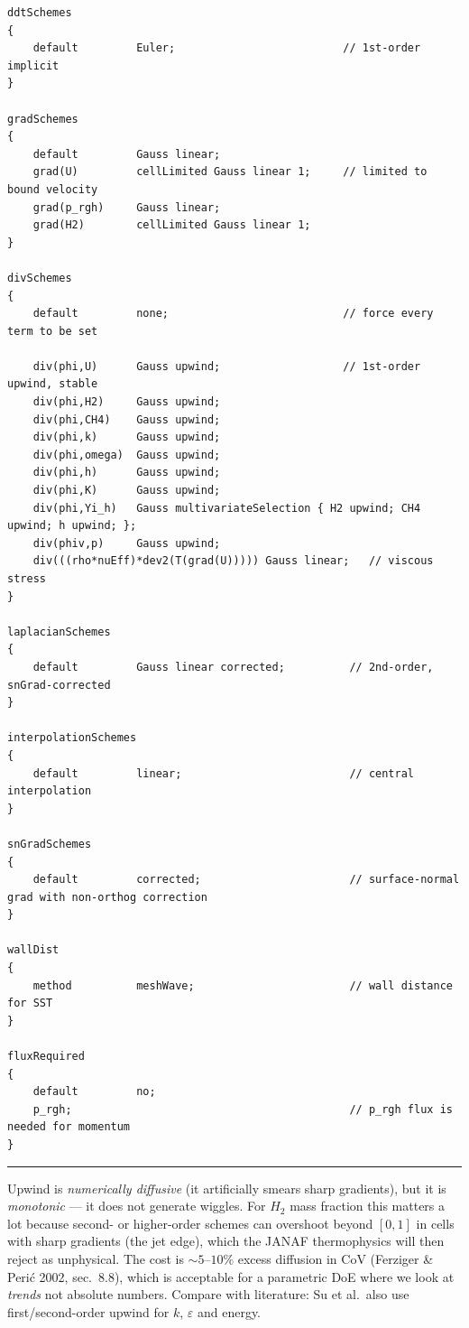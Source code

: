 \documentclass[11pt,a4paper]{article}
\newenvironment{whybox}[1][]{%
    \par\medskip\noindent
    \begin{list}{}{%
        \setlength{\leftmargin}{1.4em}%
        \setlength{\rightmargin}{0pt}%
        \setlength{\topsep}{0pt}%
    }\item[]%
    \textcolor{blue!50!black}{\rule[-0.4em]{2.5pt}{1.0em}}%
    \hspace{0.6em}{\sffamily\bfseries\color{blue!50!black}#1}\par\smallskip
}{%
    \end{list}\medskip
}
\begin{document}
\begin{lstlisting}[style=foamstyle,caption={\texttt{system/fvSchemes} (full)}]
ddtSchemes
{
    default         Euler;                          // 1st-order implicit
}

gradSchemes
{
    default         Gauss linear;
    grad(U)         cellLimited Gauss linear 1;     // limited to bound velocity
    grad(p_rgh)     Gauss linear;
    grad(H2)        cellLimited Gauss linear 1;
}

divSchemes
{
    default         none;                           // force every term to be set

    div(phi,U)      Gauss upwind;                   // 1st-order upwind, stable
    div(phi,H2)     Gauss upwind;
    div(phi,CH4)    Gauss upwind;
    div(phi,k)      Gauss upwind;
    div(phi,omega)  Gauss upwind;
    div(phi,h)      Gauss upwind;
    div(phi,K)      Gauss upwind;
    div(phi,Yi_h)   Gauss multivariateSelection { H2 upwind; CH4 upwind; h upwind; };
    div(phiv,p)     Gauss upwind;
    div(((rho*nuEff)*dev2(T(grad(U))))) Gauss linear;   // viscous stress
}

laplacianSchemes
{
    default         Gauss linear corrected;          // 2nd-order, snGrad-corrected
}

interpolationSchemes
{
    default         linear;                          // central interpolation
}

snGradSchemes
{
    default         corrected;                       // surface-normal grad with non-orthog correction
}

wallDist
{
    method          meshWave;                        // wall distance for SST
}

fluxRequired
{
    default         no;
    p_rgh;                                           // p_rgh flux is needed for momentum
}
\end{lstlisting}

\begin{whybox}[Why first-order upwind for div?]
Upwind is \emph{numerically diffusive} (it artificially smears sharp
gradients), but it is \emph{monotonic} --- it does not generate
wiggles. For $H_2$ mass fraction this matters a lot because second-
or higher-order schemes can overshoot beyond $[0,1]$ in cells with
sharp gradients (the jet edge), which the JANAF thermophysics will
then reject as unphysical. The cost is $\sim 5$--$10\%$ excess
diffusion in CoV (Ferziger \& Peri\'c 2002, sec.\ 8.8), which is
acceptable for a parametric DoE where we look at \emph{trends} not
absolute numbers. Compare with literature: Su et al.\ also use
first/second-order upwind for $k$, $\varepsilon$ and energy.
\end{whybox}
\end{document}

